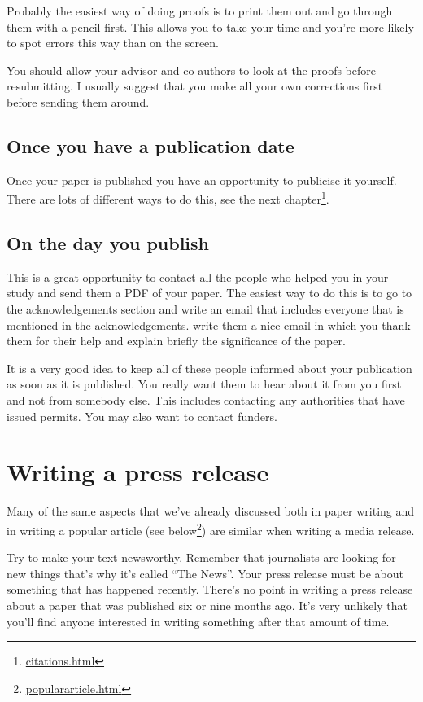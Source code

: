 \documentclass[
]{krantz}
\renewcommand{\href}[2]{#2\footnote{\url{#1}}}
\begin{document}
Probably the easiest way of doing proofs is to print them out and go through them with a pencil first. This allows you to take your time and you're more likely to spot errors this way than on the screen.

You should allow your advisor and co-authors to look at the proofs before resubmitting. I usually suggest that you make all your own corrections first before sending them around.

\hypertarget{once-you-have-a-publication-date}{%
\section{Once you have a publication date}\label{once-you-have-a-publication-date}}

Once your paper is published you have an opportunity to publicise it yourself. There are lots of different ways to do this, \href{citations.html}{see the next chapter}.

\hypertarget{on-the-day-you-publish}{%
\section{On the day you publish}\label{on-the-day-you-publish}}

This is a great opportunity to contact all the people who helped you in your study and send them a PDF of your paper. The easiest way to do this is to go to the acknowledgements section and write an email that includes everyone that is mentioned in the acknowledgements. write them a nice email in which you thank them for their help and explain briefly the significance of the paper.

It is a very good idea to keep all of these people informed about your publication as soon as it is published. You really want them to hear about it from you first and not from somebody else. This includes contacting any authorities that have issued permits. You may also want to contact funders.

\hypertarget{pressrelease}{%
\chapter{Writing a press release}\label{pressrelease}}

Many of the same aspects that we've already discussed both in paper writing and in writing a popular article (\href{populararticle.html}{see below}) are similar when writing a media release.

Try to make your text newsworthy. Remember that journalists are looking for new things that's why it's called
``The News''. Your press release must be about something that has happened recently. There's no point in writing a press release about a paper that was published six or nine months ago. It's very unlikely that you'll find anyone interested in writing something after that amount of time.
\end{document}
